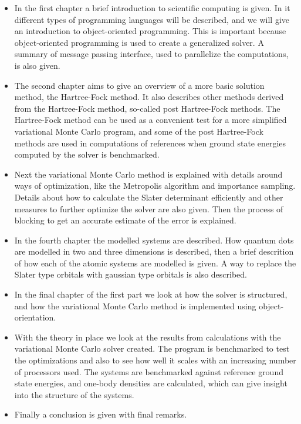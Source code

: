 \begin{itemize}
	\item In the first chapter a brief introduction to scientific computing is given. In it different types of programming languages will be described, and we will give an introduction to object-oriented programming. This is important because object-oriented programming is used to create a generalized solver. A summary of message passing interface, used to parallelize the computations, is also given.  
	\item The second chapter aims to give an overview of a more basic solution method, the Hartree-Fock method. It also describes other methods derived from the Hartree-Fock method, so-called post Hartree-Fock methods. The Hartree-Fock method can be used as a convenient test for a more simplified variational Monte Carlo program, and some of the post Hartree-Fock methods are used in computations of references when ground state energies computed by the solver is benchmarked.
	\item Next the variational Monte Carlo method is explained with details around ways of optimization, like the Metropolis algorithm and importance sampling. Details about how to calculate the Slater determinant efficiently and other measures to further optimize the solver are also given. Then the process of blocking to get an accurate estimate of the error is explained.
	\item In the fourth chapter the modelled systems are described. How quantum dots are modelled in two and three dimensions is described, then a brief descrition of how each of the atomic systems are modelled is given. A way to replace the Slater type orbitals with gaussian type orbitals is also described.
	\item In the final chapter of the first part we look at how the solver is structured, and how the variational Monte Carlo method is implemented using object-orientation.
	\item With the theory in place we look at the results from calculations with the variational Monte Carlo solver created. The program is benchmarked to test the optimizations and also to see how well it scales with an increasing number of processors used. The systems are benchmarked against reference ground state energies, and one-body densities are calculated, which can give insight into the structure of the systems. 
	\item Finally a conclusion is given with final remarks.
\end{itemize}


